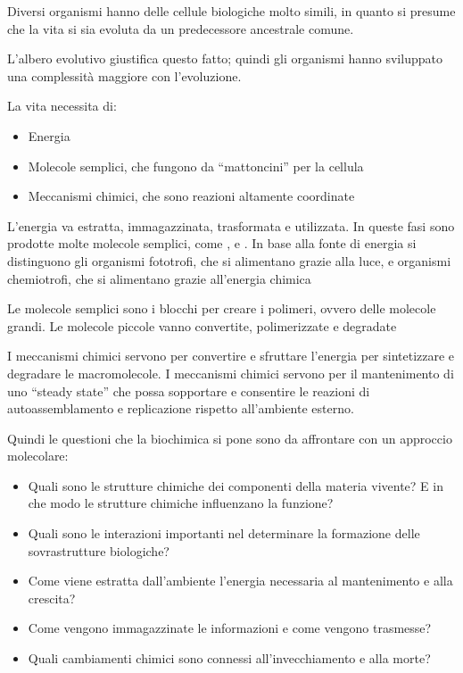Diversi organismi hanno delle cellule biologiche molto simili, in quanto
si presume che la vita si sia evoluta da un predecessore ancestrale
comune.


L'albero evolutivo giustifica questo fatto; quindi gli organismi hanno
sviluppato una complessità maggiore con l'evoluzione.

La vita necessita di:
\begin{itemize}
\item Energia
\item Molecole semplici, che fungono da
``mattoncini'' per la cellula
\item Meccanismi chimici, che sono reazioni
altamente coordinate
\end{itemize}

L'energia va estratta, immagazzinata, trasformata e utilizzata. In
queste fasi sono prodotte molte molecole semplici, come ,
 e . In base alla fonte di energia si distinguono gli
organismi fototrofi, che si alimentano grazie alla luce, e organismi
chemiotrofi, che si alimentano grazie all'energia chimica

Le molecole semplici sono i blocchi per creare i polimeri, ovvero delle
molecole grandi. Le molecole piccole vanno convertite, polimerizzate e
degradate



I meccanismi chimici servono per convertire e sfruttare l'energia per
sintetizzare e degradare le macromolecole. I meccanismi chimici servono
per il mantenimento di uno ``steady state'' che possa sopportare e
consentire le reazioni di autoassemblamento e replicazione rispetto
all'ambiente esterno.

Quindi le questioni che la biochimica si pone sono da affrontare con un
approccio molecolare:
\begin{itemize}
    \item Quali sono le strutture chimiche dei componenti della materia vivente? E
    in che modo le strutture chimiche influenzano la funzione?
    \item Quali sono le interazioni importanti nel determinare la formazione delle sovrastrutture biologiche?
    \item Come viene estratta dall'ambiente l'energia necessaria al mantenimento e
    alla crescita?
    \item Come vengono immagazzinate le informazioni e come vengono trasmesse?
    \item Quali cambiamenti chimici sono connessi all'invecchiamento e alla morte?
\end{itemize}

